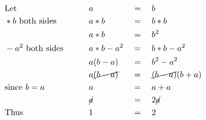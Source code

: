 \begin{alignat*}{3}
&\mathrm{Let}&&a&&=\quad b\\
&*b~\mathrm{both~sides}&&a*b&&=\quad b*b\\
&\,&&a*b&&=\quad b^2\\
&-a^2~\mathrm{both~sides}\qquad&& a*b-a^2&&=\quad b*b-a^2\\
&\,&&a(b-a)&&=\quad b^2-a^2\\
&\,&&a\cancel{(b-a)}&&=\quad\cancel{(b-a)}(b+a)\\
&\mathrm{since}~b=a&&a&&=\quad a+a\\
&\,&&\cancel{a}&&=\quad2\cancel{a}\\
&\mathrm{Thus}&&1&&=\quad2
\end{alignat*}
